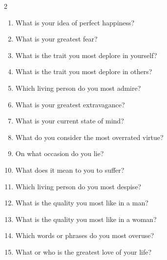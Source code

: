 \documentclass[11pt, a4paper]{article}
\begin{document}
\vspace{0.3em}
\begin{multicols}{2}
\begin{enumerate}[leftmargin=0.5em, itemsep=0.3em, label=\textbf{\arabic*.}]
    \item What is your idea of perfect happiness?

    \hrulefill

    \item What is your greatest fear?

    \hrulefill

    \item What is the trait you most deplore in yourself?

    \hrulefill

    \item What is the trait you most deplore in others?

    \hrulefill

    \item Which living person do you most admire?

    \hrulefill

    \item What is your greatest extravagance?

    \hrulefill

    \item What is your current state of mind?

    \hrulefill

    \item What do you consider the most overrated virtue?

    \hrulefill

    \item On what occasion do you lie?

    \hrulefill
    \item What does it mean to you to suffer?

    \hrulefill
    \item Which living person do you most despise?

    \hrulefill
    \item What is the quality you most like in a man?

    \hrulefill
    \item What is the quality you most like in a woman?

    \hrulefill
    \item Which words or phrases do you most overuse?

    \hrulefill
    \item What or who is the greatest love of your life?


\end{enumerate}
\end{multicols}
\end{document}
